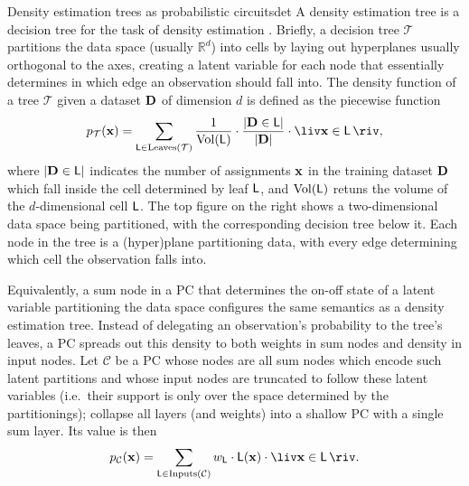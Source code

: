 \begin{example}[sidebyside,lefthand width=0.55\textwidth]{Density estimation trees as probabilistic circuits}{det}
  A density estimation tree is a decision tree for the task of density estimation \citep{ram11}.
  Briefly, a decision tree $\mathcal{T}$ partitions the data space (usually $\mathbb{R}^d$) into
  cells by laying out hyperplanes usually orthogonal to the axes, creating a latent variable for
  each node that essentially determines in which edge an observation should fall into. The density
  function of a tree $\mathcal{T}$ given a dataset $\mathbf{D}$ of dimension $d$ is defined as the
  piecewise function
  \begin{equation*}
    p_\mathcal{T}(\set{x})=\sum_{\Leaf\in\operatorname{Leaves}(\mathcal{T})}\frac{1}{\operatorname{Vol}(\Leaf)}\cdot\frac{\left|\set{D}\in\Leaf\right|}{|\set{D}|}\cdot\liv\set{x}\in\Leaf\riv,
  \end{equation*}
  where $\left|\mathbf{D}\in\operatorname{\textup{\textsf{L}}}\right|$ indicates the number of assignments $\mathbf{x}$ in the
  training dataset $\mathbf{D}$ which fall inside the cell determined by leaf $\operatorname{\textup{\textsf{L}}}$, and
  $\operatorname{Vol}(\operatorname{\textup{\textsf{L}}})$ retuns the volume of the $d$-dimensional cell $\operatorname{\textup{\textsf{L}}}$. The top figure
  on the right shows a two-dimensional data space being partitioned, with the corresponding
  decision tree below it. Each node in the tree is a (hyper)plane partitioning data, with every
  edge determining which cell the observation falls into.

  Equivalently, a sum node in a PC that determines the on-off state of a latent variable
  partitioning the data space configures the same semantics as a density estimation tree. Instead
  of delegating an observation's probability to the tree's leaves, a PC spreads out this density to
  both weights in sum nodes and density in input nodes. Let $\mathcal{C}$ be a PC whose nodes are all
  sum nodes which encode such latent partitions and whose input nodes are truncated to follow these
  latent variables (i.e.\ their support is only over the space determined by the partitionings);
  collapse all layers (and weights) into a shallow PC with a single sum layer. Its value is then
  \begin{equation*}
    p_\mathcal{C}(\set{x})=\sum_{\Leaf\in\operatorname{Inputs}(\mathcal{C})}w_{\Leaf}\cdot\Leaf(\set{x})\cdot\liv\set{x}\in\Leaf\riv.
  \end{equation*}
  \tcblower
  \centering
\end{example}
